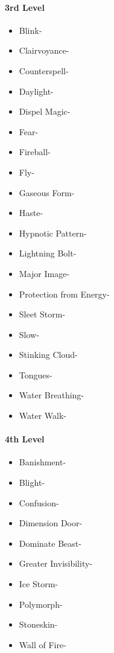 \documentclass[
]{article}
\providecommand{\tightlist}{%
  \setlength{\itemsep}{0pt}\setlength{\parskip}{0pt}}
\begin{document}
\hypertarget{3rd-level-5}{%
\paragraph{3rd Level}\label{3rd-level-5}}

\begin{itemize}
\tightlist
\item
  Blink-
\item
  Clairvoyance-
\item
  Counterspell-
\item
  Daylight-
\item
  Dispel Magic-
\item
  Fear-
\item
  Fireball-
\item
  Fly-
\item
  Gaseous Form-
\item
  Haste-
\item
  Hypnotic Pattern-
\item
  Lightning Bolt-
\item
  Major Image-
\item
  Protection from Energy-
\item
  Sleet Storm-
\item
  Slow-
\item
  Stinking Cloud-
\item
  Tongues-
\item
  Water Breathing-
\item
  Water Walk-
\end{itemize}

\hypertarget{4th-level-5}{%
\paragraph{4th Level}\label{4th-level-5}}

\begin{itemize}
\tightlist
\item
  Banishment-
\item
  Blight-
\item
  Confusion-
\item
  Dimension Door-
\item
  Dominate Beast-
\item
  Greater Invisibility-
\item
  Ice Storm-
\item
  Polymorph-
\item
  Stoneskin-
\item
  Wall of Fire-
\end{itemize}
\end{document}
